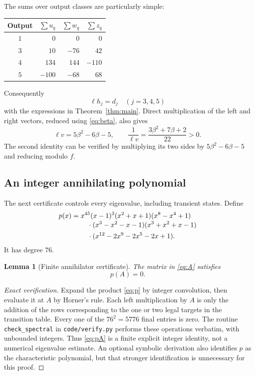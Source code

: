 \documentclass[11pt,a4paper]{article}
\newtheorem{lemma}[theorem]{Lemma}
\theoremstyle{definition}
\theoremstyle{remark}
\newcommand{\code}[1]{\texttt{#1}}
\begin{document}
The sums over output classes are particularly simple:
\begin{center}
\begin{tabular}{@{}crrr@{}}
\toprule
Output & $\sum u_q$ & $\sum w_q$ & $\sum z_q$\\
\midrule
$1$ & $0$ & $0$ & $0$\\
$3$ & $10$ & $-76$ & $42$\\
$4$ & $134$ & $144$ & $-110$\\
$5$ & $-100$ & $-68$ & $68$\\
\bottomrule
\end{tabular}
\end{center}
Consequently
\begin{equation}\label{eq:leftdensity}
 \ell h_j=d_j\quad(j=3,4,5)
\end{equation}
with the expressions in Theorem~\ref{thm:main}. Direct multiplication of
the left and right vectors, reduced using \eqref{eq:beta}, also gives
\begin{equation}\label{eq:normalization}
 \ell v=5\beta^2-6\beta-5,
 \qquad
 \frac1{\ell v}=\frac{3\beta^2+7\beta+2}{22}>0.
\end{equation}
The second identity can be verified by multiplying its two sides by
$5\beta^2-6\beta-5$ and reducing modulo $f$.

\subsection{An integer annihilating polynomial}
The next certificate controls every eigenvalue, including transient states.
Define
\begin{align}
 p(x)={}&x^{45}(x-1)^3(x^2+x+1)(x^8-x^4+1)
 \notag\\[-1mm]
 &\quad\cdot(x^3-x^2-x-1)(x^3+x^2+x-1)
 \notag\\
 &\quad\cdot(x^{12}-2x^9-2x^5-2x+1).
 \label{eq:p}
\end{align}
It has degree $76$.

\begin{lemma}[Finite annihilator certificate]\label{lem:annihilator}
The matrix in \eqref{eq:A} satisfies
\begin{equation}\label{eq:pA}
 p(A)=0.
\end{equation}
\end{lemma}
\begin{proof}[Exact verification]
Expand the product \eqref{eq:p} by integer convolution, then evaluate it at
$A$ by Horner's rule. Each left multiplication by $A$ is only the addition
of the rows corresponding to the one or two legal targets in the transition
table. Every one of the $76^2=5776$ final entries is zero.
The routine \code{check\_spectral} in \code{code/verify.py} performs these
operations verbatim, with unbounded integers. Thus \eqref{eq:pA} is a
finite explicit integer identity, not a numerical eigenvalue estimate.
An optional symbolic derivation also identifies $p$ as the characteristic
polynomial, but that stronger identification is unnecessary for this proof.
\end{proof}
\end{document}
